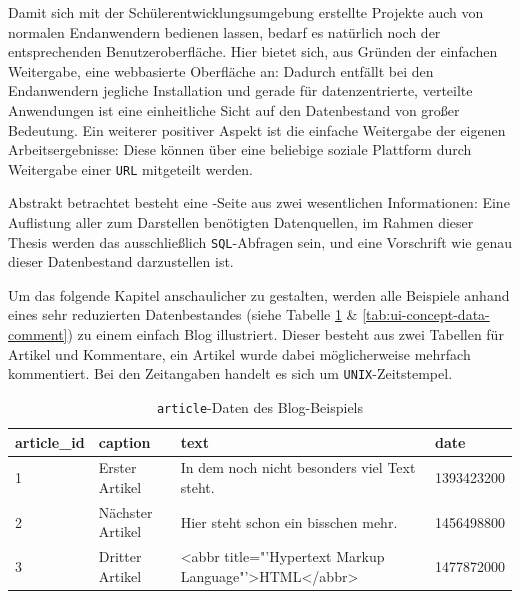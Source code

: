 
Damit sich mit der Schülerentwicklungsumgebung erstellte Projekte auch von normalen Endanwendern bedienen lassen, bedarf es natürlich noch der entsprechenden Benutzeroberfläche. Hier bietet sich, aus Gründen der einfachen Weitergabe, eine webbasierte Oberfläche an: Dadurch entfällt bei den Endanwendern jegliche Installation und gerade für datenzentrierte, verteilte Anwendungen ist eine einheitliche Sicht auf den Datenbestand von großer Bedeutung. Ein weiterer positiver Aspekt ist die einfache Weitergabe der eigenen Arbeitsergebnisse: Diese können über eine beliebige soziale Plattform durch Weitergabe einer \texttt{URL} mitgeteilt werden.

Abstrakt betrachtet besteht eine \idename{}-Seite aus zwei wesentlichen Informationen: Eine Auflistung aller zum Darstellen benötigten Datenquellen, im Rahmen dieser Thesis werden das ausschließlich \texttt{SQL}-Abfragen sein, und eine Vorschrift wie genau dieser Datenbestand darzustellen ist.

Um das folgende Kapitel anschaulicher zu gestalten, werden alle Beispiele anhand eines sehr reduzierten Datenbestandes (siehe Tabelle \ref{tab:ui-concept-data-article} \& \ref{tab:ui-concept-data-comment}) zu einem einfach Blog illustriert. Dieser besteht aus zwei Tabellen für Artikel und Kommentare, ein Artikel wurde dabei möglicherweise mehrfach kommentiert. Bei den Zeitangaben handelt es sich um \texttt{UNIX}-Zeitstempel.

\begin{table}[h]
  \centering
  \begin{tabularx}{\linewidth}{ l l X l }
    article\_id&caption&text&date\\
    \hline
    1&Erster Artikel&In dem noch nicht besonders viel Text steht.&1393423200\\
    2&Nächster Artikel&Hier steht schon ein bisschen mehr.&1456498800\\
    3&Dritter Artikel&<abbr title="'Hypertext Markup Language"'>HTML</abbr>&1477872000\\
  \end{tabularx}
  \caption{\texttt{article}-Daten des Blog-Beispiels}
  \label{tab:ui-concept-data-article}
\end{table}

